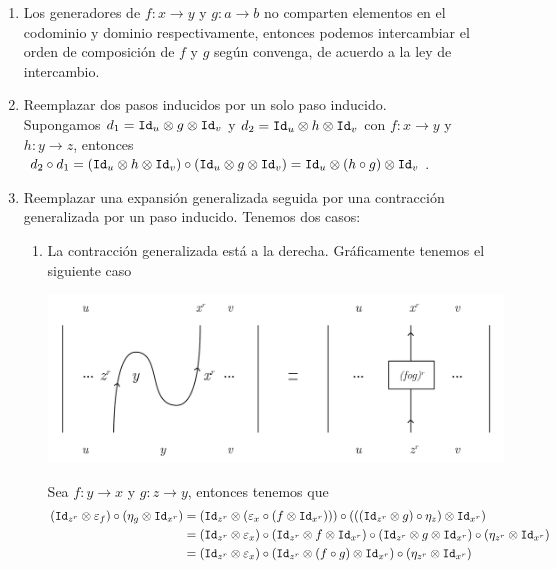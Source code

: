 \documentclass[../main.tex]{subfiles}
\begin{document}
    \begin{enumerate}
            \item Los generadores de $f:x \to y$ y $g:a \to b$ no comparten elementos en el codominio y dominio respectivamente, entonces podemos intercambiar el orden de composición de $f$ y $g$ según convenga, de acuerdo a la ley de intercambio. 
            \item Reemplazar dos pasos inducidos por un solo paso inducido. \\
            Supongamos $d_1 = \texttt{Id}_u \otimes g \otimes \texttt{Id}_v$ y $d_2 = \texttt{Id}_u \otimes h \otimes \texttt{Id}_v$ con $f:x \to y$ y $h:y \to z$, entonces $d_2 \circ d_1 = (\texttt{Id}_u \otimes h \otimes \texttt{Id}_v) \circ (\texttt{Id}_u \otimes g \otimes \texttt{Id}_v) = \texttt{Id}_u \otimes (h \circ g) \otimes \texttt{Id}_v$.
            \item Reemplazar una expansión generalizada seguida por una contracción generalizada por un paso inducido. Tenemos dos casos:
            \begin{enumerate}
                \item La contracción generalizada está a la derecha. Gráficamente tenemos el siguiente caso 
                \begin{center} \includegraphics[scale=.2]{TeX/diagrama/5-8.pdf}
                \end{center}
                Sea $f:y \to x$ y $g:z \to y$, entonces tenemos que 
                \begin{align*}
                    (\id_{z^r}\otimes \varepsilon_f) \circ (\eta_g \otimes \id_{x^r}) &= (\id_{z^r} \otimes (\varepsilon_x \circ (f \otimes \id_{x^r}))) \circ (((\id_{z^r} \otimes g) \circ \eta_z)\otimes \id_{x^r} ) \\
                    &= (\id_{z^r} \otimes \varepsilon_x) \circ (\id_{z^r} \otimes f \otimes \id_{x^r}) \circ (\id_{z^r} \otimes g \otimes \id_{x^r}) \circ (\eta_{z^r} \otimes \id_{x^r}) \\
                    &= (\id_{z^r} \otimes \varepsilon_x) \circ (\id_{z^r} \otimes (f\circ g) \otimes \id_{x^r}) \circ (\eta_{z^r} \otimes \id_{x^r}) \\

\end{align*}
\end{enumerate}
\end{enumerate}
\end{document}
